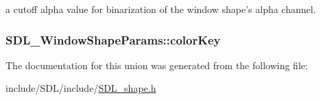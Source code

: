 a cutoff alpha value for binarization of the window shape's alpha channel. 

\hypertarget{union_s_d_l___window_shape_params_a8bf3e442a51a1bbf452cfec7c1ed5318}{
\subsubsection[{color\-Key}]{ S\-D\-L\-\_\-\-Window\-Shape\-Params\-::color\-Key}}\label{union_s_d_l___window_shape_params_a8bf3e442a51a1bbf452cfec7c1ed5318}


The documentation for this union was generated from the following file\-:\begin{DoxyCompactItemize}
\item 
include/\-S\-D\-L/include/\hyperlink{_s_d_l__shape_8h}{S\-D\-L\-\_\-shape.\-h}\end{DoxyCompactItemize}
